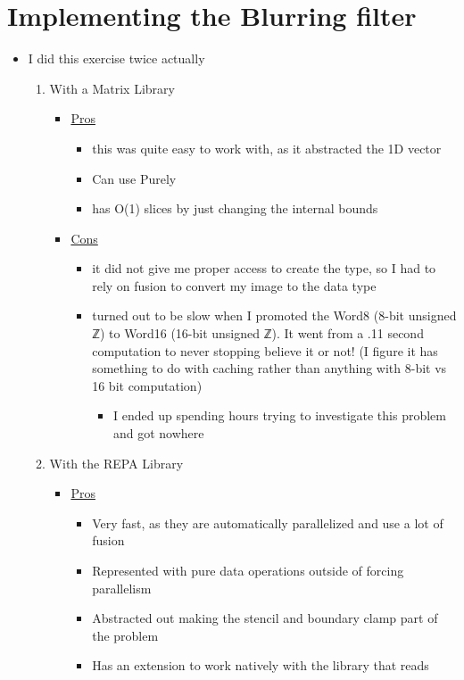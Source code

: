 \documentclass{article}
\begin{document}
\section{Implementing the Blurring filter}
\label{sec-2}
\begin{itemize}
\item I did this exercise twice actually
\begin{enumerate}
\item With a Matrix Library
\begin{itemize}
\item \uline{Pros}
\begin{itemize}
\item this was quite easy to work with, as it abstracted the 1D vector
\item Can use Purely
\item has O(1) slices by just changing the internal bounds
\end{itemize}
\item \uline{Cons}
\begin{itemize}
\item it did not give me proper access to create the type, so I had to
rely on fusion to convert my image to the data type
\item turned out to be slow when Ι promoted the Word8 (8-bit unsigned
ℤ) to Word16 (16-bit unsigned ℤ). It went from a .11 second
computation to never stopping believe it or not! (I figure it has
something to do with caching rather than anything with 8-bit vs
16 bit computation)
\begin{itemize}
\item I ended up spending hours trying to investigate this
problem and got nowhere
\end{itemize}
\end{itemize}
\end{itemize}
\item With the REPA Library
\begin{itemize}
\item \uline{Pros}
\begin{itemize}
\item Very fast, as they are automatically parallelized and use a lot
of fusion
\item Represented with pure data operations outside of forcing
parallelism
\item Abstracted out making the stencil and boundary clamp part of
the problem
\item Has an extension to work natively with the library that reads

\end{itemize}
\end{itemize}
\end{enumerate}
\end{itemize}
\end{document}
